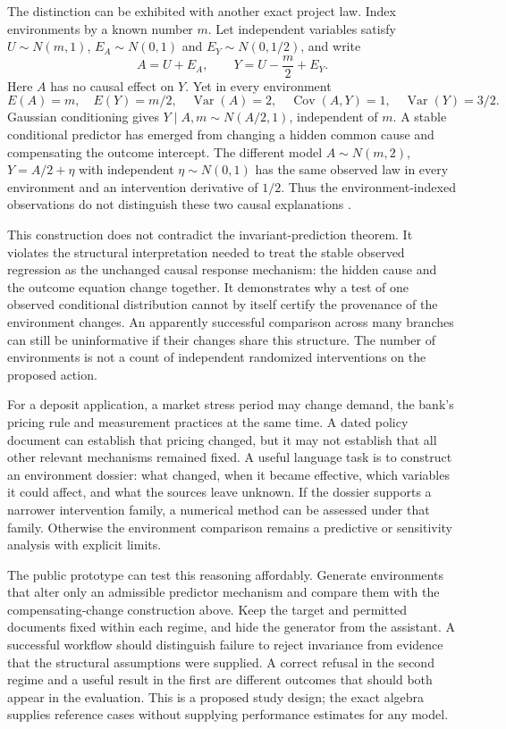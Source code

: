 The distinction can be exhibited with another exact project law. Index
environments by a known number $m$. Let independent variables satisfy
$U\sim N(m,1)$, $E_A\sim N(0,1)$ and $E_Y\sim N(0,1/2)$, and write
\[
 A=U+E_A,\qquad Y=U-\frac m2+E_Y.
\]
Here $A$ has no causal effect on $Y$. Yet in every environment
\[
 E(A)=m,\quad E(Y)=m/2,\quad
 \operatorname{Var}(A)=2,\quad \operatorname{Cov}(A,Y)=1,
 \quad\operatorname{Var}(Y)=3/2.
\]
Gaussian conditioning gives $Y\mid A,m\sim N(A/2,1)$, independent of $m$.
A stable conditional predictor has emerged from changing a hidden common
cause and compensating the outcome intercept. The different model
$A\sim N(m,2)$, $Y=A/2+\eta$ with independent $\eta\sim N(0,1)$ has
the same observed law in every environment and an intervention derivative
of $1/2$. Thus the environment-indexed observations do not distinguish these
two causal explanations \citep{exec14_discovery_design_oracles}.

This construction does not contradict the invariant-prediction theorem. It
violates the structural interpretation needed to treat the stable observed
regression as the unchanged causal response mechanism: the hidden cause and
the outcome equation change together. It demonstrates why a test of one
observed conditional distribution cannot by itself certify the provenance of
the environment changes. An apparently successful comparison across many
branches can still be uninformative if their changes share this structure.
The number of environments is not a count of independent randomized
interventions on the proposed action.

For a deposit application, a market stress period may change demand, the
bank's pricing rule and measurement practices at the same time. A dated
policy document can establish that pricing changed, but it may not establish
that all other relevant mechanisms remained fixed. A useful language task is
to construct an environment dossier: what changed, when it became effective,
which variables it could affect, and what the sources leave unknown. If the
dossier supports a narrower intervention family, a numerical method can be
assessed under that family. Otherwise the environment comparison remains a
predictive or sensitivity analysis with explicit limits.

The public prototype can test this reasoning affordably. Generate environments
that alter only an admissible predictor mechanism and compare them with the
compensating-change construction above. Keep the target and permitted
documents fixed within each regime, and hide the generator from the assistant.
A successful workflow should distinguish failure to reject invariance from
evidence that the structural assumptions were supplied. A correct refusal in
the second regime and a useful result in the first are different outcomes
that should both appear in the evaluation. This is a proposed study design;
the exact algebra supplies reference cases without supplying performance
estimates for any model.

